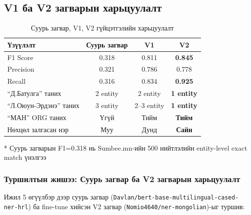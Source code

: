 \subsection{V1 ба V2 загварын харьцуулалт}

\begin{table}[h!]
\centering
\renewcommand{\arraystretch}{1.4}
\begin{tabular}{|l|c|c|c|}
\hline
\textbf{Үзүүлэлт} & \textbf{Суурь загвар} & \textbf{V1} & \textbf{V2} \\ \hline
F1 Score & 0.318 & 0.811 & \textbf{0.845} \\ \hline
Precision & 0.321 & 0.786 & 0.778 \\ \hline
Recall & 0.316 & 0.834 & \textbf{0.925} \\ \hline
``Д.Батулга'' таних & 2 entity & 2 entity & \textbf{1 entity} \\ \hline
``Л.Оюун-Эрдэнэ'' таних & 3 entity & 2--3 entity & \textbf{1 entity} \\ \hline
``МАН'' ORG таних & Үгүй & Тийм & \textbf{Тийм} \\ \hline
Нөхцөл залгасан нэр & Муу & Дунд & \textbf{Сайн} \\ \hline
\end{tabular}
\caption{Суурь загвар, V1, V2 гүйцэтгэлийн харьцуулалт}
\label{tab:model_comparison}

\small{* Суурь загварын F1=0.318 нь Sumbee.mn-ийн 500 нийтлэлийн entity-level exact match үнэлгээ}
\end{table}

\subsubsection{Туршилтын жишээ: Суурь загвар ба V2 загварын харьцуулалт}

Ижил 5 өгүүлбэр дээр суурь загвар (\texttt{Davlan/bert-base-multilingual-cased-ner-hrl}) ба fine-tune хийсэн V2 загвар (\texttt{Nomio4640/ner-mongolian})-ыг туршив:

